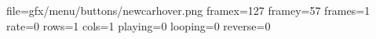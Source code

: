 file=gfx/menu/buttons/newcarhover.png
framex=127
framey=57
frames=1
rate=0
rows=1
cols=1
playing=0
looping=0
reverse=0